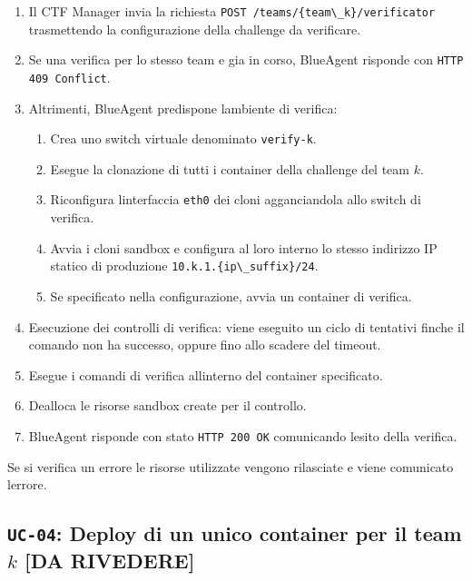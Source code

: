 \begin{enumerate}
\def\labelenumi{\arabic{enumi}.}
\tightlist
\item
  Il CTF Manager invia la richiesta
  \passthrough{\lstinline!POST /teams/\{team\_k\}/verificator!}
  trasmettendo la configurazione della challenge da verificare.
\item
  Se una verifica per lo stesso team e\textquotesingle{} gia in corso,
  BlueAgent risponde con \passthrough{\lstinline!HTTP 409 Conflict!}.
\item
  Altrimenti, BlueAgent predispone l\textquotesingle ambiente di
  verifica:

  \begin{enumerate}
  \def\labelenumii{\arabic{enumii}.}
  \tightlist
  \item
    Crea uno switch virtuale denominato
    \passthrough{\lstinline!verify-k!}.
  \item
    Esegue la clonazione di tutti i container della challenge del team
    \(k\).
  \item
    Riconfigura l\textquotesingle interfaccia
    \passthrough{\lstinline!eth0!} dei cloni agganciandola allo switch
    di verifica.
  \item
    Avvia i cloni sandbox e configura al loro interno lo stesso
    indirizzo IP statico di produzione
    \passthrough{\lstinline!10.k.1.\{ip\_suffix\}/24!}.
  \item
    Se specificato nella configurazione, avvia un container di verifica.
  \end{enumerate}
\item
  Esecuzione dei controlli di verifica: viene eseguito un ciclo di
  tentativi finche\textquotesingle{} il comando non ha successo, oppure
  fino allo scadere del timeout.
\item
  Esegue i comandi di verifica all\textquotesingle interno del container
  specificato.
\item
  Dealloca le risorse sandbox create per il controllo.
\item
  BlueAgent risponde con stato \passthrough{\lstinline!HTTP 200 OK!}
  comunicando l\textquotesingle esito della verifica.
\end{enumerate}

Se si verifica un errore le risorse utilizzate vengono rilasciate e
viene comunicato l\textquotesingle errore.

\subsection{\texorpdfstring{\texttt{UC-04}: Deploy di un unico container
per il team \(k\) {[}DA
RIVEDERE{]}}{UC-04: Deploy di un unico container per il team k {[}DA RIVEDERE{]}}}\label{uc-04-deploy-di-un-unico-container-per-il-team-k-da-rivedere}


